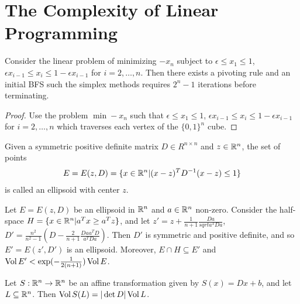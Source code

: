 \section{The Complexity of Linear Programming}
\label{sec:compl-line-progr}

\begin{thm}
  \label{sec:compl-line-progr-1}
  Consider the linear problem of minimizing $-x_{n}$ subject to
  $\epsilon \leq x_{1} \leq 1$, $\epsilon x_{i-1} \leq x_{i} \leq 1 -
  \epsilon x_{i-1}$ for $i = 2, \dots, n$. Then there exists a
  pivoting rule and an initial BFS such the simplex methods requires
  $2^{n} - 1$ iterations before terminating.
\end{thm}

\begin{proof}
  Use the problem $\min -x_{n}$ such that $\epsilon \leq x_{1} \leq 1$,
  $\epsilon x_{i-1} \leq x_{i} \leq 1 - \epsilon x_{i-1}$ for $i = 2,
  \dots, n$ which traverses each vertex of the $\{ 0, 1 \}^{n}$ cube.
\end{proof}

\begin{defn}
  \label{sec:compl-line-progr-2}
  Given a symmetric positive definite matrix $D \in R^{n \times n}$
  and $z \in \mathbb{R}^{n}$, the set of points
  \begin{align}
    \label{eq:5}
    E = E(z, D) = \{ x \in \mathbb{R}^{n} | (x - z)^{T} D^{-1}(x - z) \leq 1 \}
  \end{align} is called an ellipsoid with center $z$.
\end{defn}

\begin{thm}
  \label{sec:compl-line-progr-3}
  Let $E = E(z, D)$ be an ellipsoid in $\mathbb{R}^{n}$ and $a \in \mathbb{R}^{n}$
  non-zero.  Consider the half-space $H = \{ x \in \mathbb{R}^{n} | a^{T} x
  \geq a^{T}z \} $, and let $z' = z + \frac{1}{n+1}
  \frac{Da}{sqrt{a^{T}Da}}$, $D' = \frac{n^{2}}{n^{2} - 1}(D -
  \frac{2}{n+1}\frac{Daa^{T}D}{a^{T}Da})$.  Then $D'$ is symmetric and
  positive definite, and so $E' = E(z', D')$ is an ellipsoid.
  Moreover, $E \cap H \subseteq E'$ and $\operatorname*{Vol} E' <
  \exp(-\frac{1}{2(n+1)}) \operatorname*{Vol} E$.
\end{thm}

\begin{thm}
  \label{sec:compl-line-progr-4}
  Let $S: \mathbb{R}^{n} \rightarrow \mathbb{R}^{n}$ be an affine transformation given
  by $S(x) = Dx + b$, and let $L \subseteq \mathbb{R}^{n}$.  Then $\operatorname*{Vol} S(L) =
  |\det D| \operatorname*{Vol} L$.
\end{thm}

